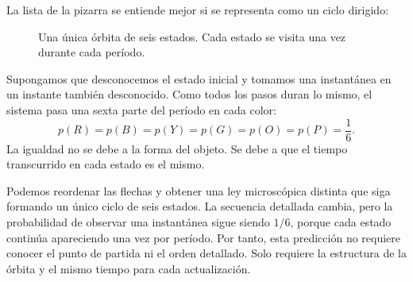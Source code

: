 La lista de la pizarra se entiende mejor si se representa como un ciclo dirigido:
\begin{figure}[htbp]
\centering
{}
\caption{Una única órbita de seis estados. Cada estado se visita una vez durante cada período.}
\label{fig:sm1-six-cycle}
\end{figure}

Supongamos que desconocemos el estado inicial y tomamos una instantánea en un instante también desconocido. Como todos los pasos duran lo mismo, el sistema pasa una sexta parte del período en cada color:
\begin{equation}
 p(R)=p(B)=p(Y)=p(G)=p(O)=p(P)=\frac16.
 \label{eq:sm1-uniform-cycle}
\end{equation}
La igualdad no se debe a la forma del objeto. Se debe a que el tiempo transcurrido en cada estado es el mismo.

Podemos reordenar las flechas y obtener una ley microscópica distinta que siga formando un único ciclo de seis estados. La secuencia detallada cambia, pero la probabilidad de observar una instantánea sigue siendo \(1/6\), porque cada estado continúa apareciendo una vez por período. Por tanto, esta predicción no requiere conocer el punto de partida ni el orden detallado. Solo requiere la estructura de la órbita y el mismo tiempo para cada actualización.

\begin{classroomqa}
\end{classroomqa}


